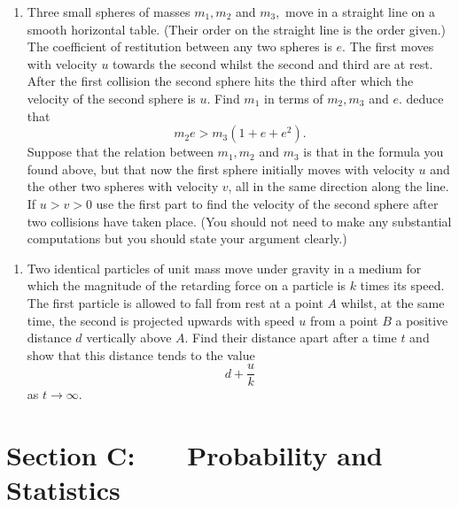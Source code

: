 \documentclass[a4, 11pt]{report}
\newlength{\qspace}
\newcounter{qnumber}
\newenvironment{question}%
 {\vspace{\qspace}
  \begin{enumerate}[\bfseries 1\quad][10]%
    \setcounter{enumi}{\value{qnumber}}%
    \item%
 }
{
  \end{enumerate}
  \filbreak
  \stepcounter{qnumber}
 }
\begin{document}
\begin{question}	
Three small spheres of masses $m_{1},m_{2}$ and $m_{3},$ move in
a straight line on a smooth horizontal table. (Their order on the
straight line is the order given.) The coefficient of restitution
between any two spheres is $e$. The first moves with velocity $u$
towards the second whilst the second and third are at rest. After
the first collision the second sphere hits the third after which the
velocity of the second sphere is $u.$ Find $m_{1}$ in terms of $m_{2},m_{3}$
and $e$. deduce that 
\[
m_{2}e>m_{3}(1+e+e^{2}).
\]
Suppose that the relation between $m_{1},m_{2}$ and $m_{3}$ is that
in the formula you found above, but that now the first sphere initially
moves with velocity $u$ and the other two spheres with velocity $v$,
all in the same direction along the line. If $u>v>0$ use the first
part to find the velocity of the second sphere after two collisions
have taken place. (You should not need to make any substantial computations
but you should state your argument clearly.) 
\end{question}


\begin{question}
Two identical particles of unit mass move under gravity in a medium
for which the magnitude of the retarding force on a particle is $k$
times its speed. The first particle is allowed to fall from rest at
a point $A$ whilst, at the same time, the second is projected upwards
with speed $u$ from a point $B$ a positive distance $d$ vertically
above $A$. Find their distance apart after a time $t$ and show that
this distance tends to the value 
\[
d+\frac{u}{k}
\]
as $t\rightarrow\infty.$ 
\end{question}
	

	
	\newpage
\section*{Section C: \ \ \ Probability and Statistics}
\end{document}
